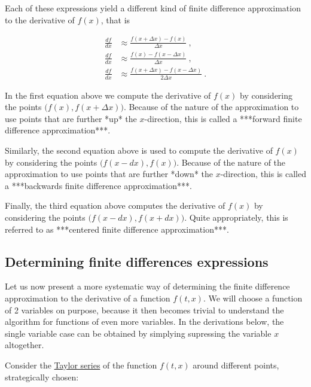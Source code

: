 \documentclass[a4paper,11pt]{article}
\begin{document}
Each of these expressions yield a different kind of finite difference approximation to the derivative of $f(x)$, that is

\begin{equation}
\begin{aligned}
\frac{df}{dx} &\approx \frac{f(x+\Delta x) - f(x)}{\Delta x}    \ ,\\
\frac{df}{dx} &\approx \frac{f(x)    - f(x-\Delta x)}{\Delta x} \ ,\\
\frac{df}{dx} &\approx \frac{f(x+\Delta x) - f(x-\Delta x)}{2\Delta x}\ .
\end{aligned}
\end{equation}

In the first equation above we compute the derivative of $f(x)$ by considering the points $\big(f(x),f(x+\Delta x)\big)$. Because of the nature of the approximation to use points that are further *up* the $x$-direction, this is called a ***forward finite difference approximation***.

Similarly, the second equation above is used to compute the derivative of $f(x)$ by considering the points $\big(f(x-dx),f(x)\big)$. Because of the nature of the approximation to use points that are further *down* the $x$-direction, this is called a ***backwards finite difference approximation***.

Finally, the third equation above computes the derivative of $f(x)$ by considering the points $\big(f(x-dx),f(x+dx)\big)$. Quite appropriately, this is referred to as ***centered finite difference approximation***.

\subsection{Determining finite differences expressions}

Let us now present a more systematic way of determining the finite difference approximation to the derivative of a function $f(t,x)$. We will choose a function of 2 variables on purpose, because it then becomes trivial to understand the algorithm for functions of even more variables. In the derivations below, the single variable case can be obtained by simplying supressing the variable $x$ altogether.

Consider the \href{https://en.wikipedia.org/wiki/Taylor_series}{Taylor series} of the function $f(t,x)$ around different points, strategically chosen:
\end{document}
